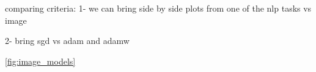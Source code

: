 comparing criteria: 
1- we can bring side by side plots from one of the nlp tasks vs image

2- bring sgd vs adam and adamw


\autoref{fig:image_models}
\begin{figure}[t]
    \centering
\end{figure}
